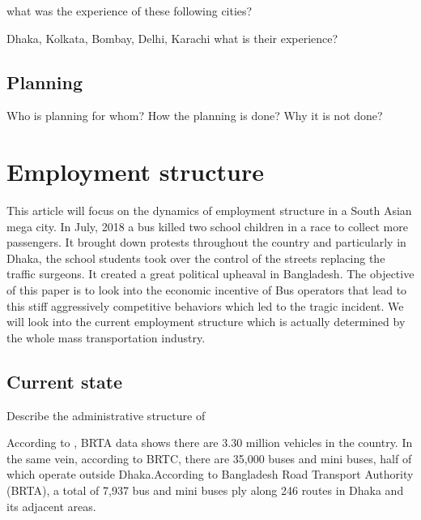 \documentclass[11pt,]{article}
\begin{document}
what was the experience of these following cities?

Dhaka, Kolkata, Bombay, Delhi, Karachi what is their experience?

\subsection{Planning}\label{planning}

Who is planning for whom? How the planning is done? Why it is not done?

\section{Employment structure}\label{employment-structure}

This article will focus on the dynamics of employment structure in a
South Asian mega city. In July, 2018 a bus killed two school children in
a race to collect more passengers. It brought down protests throughout
the country and particularly in Dhaka, the school students took over the
control of the streets replacing the traffic surgeons. It created a
great political upheaval in Bangladesh. The objective of this paper is
to look into the economic incentive of Bus operators that lead to this
stiff aggressively competitive behaviors which led to the tragic
incident. We will look into the current employment structure which is
actually determined by the whole mass transportation industry.

\subsection{Current state}\label{current-state-1}

Describe the administrative structure of

According to \textcite{anwar_palo_words_2018}, BRTA data shows there are
3.30 million vehicles in the country. In the same vein, according to
BRTC, there are 35,000 buses and mini buses, half of which operate
outside Dhaka.According to Bangladesh Road Transport Authority (BRTA), a
total of 7,937 bus and mini buses ply along 246 routes in Dhaka and its
adjacent areas.
\end{document}
